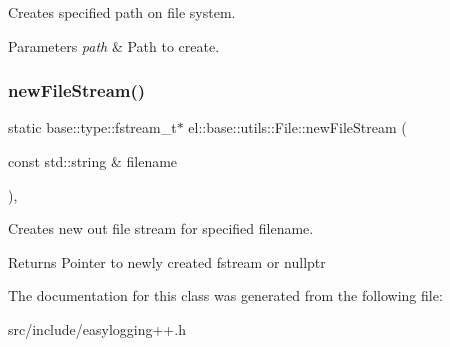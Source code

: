 Creates specified path on file system. 


\begin{DoxyParams}{Parameters}
{\em path} & Path to create. \\
\hline
\end{DoxyParams}
\mbox{\label{classel_1_1base_1_1utils_1_1_file_aa4bef1f2e00269d75c1c1eabb0ce4563}} 
\subsubsection{\texorpdfstring{new\+File\+Stream()}{newFileStream()}}
{\footnotesize\ttfamily static base\+::type\+::fstream\+\_\+t$\ast$ el\+::base\+::utils\+::\+File\+::new\+File\+Stream (\begin{DoxyParamCaption}\item[{const std\+::string \&}]{filename }\end{DoxyParamCaption})\hspace{0.3cm}{\ttfamily [inline]}, {\ttfamily [static]}}



Creates new out file stream for specified filename. 

\begin{DoxyReturn}{Returns}
Pointer to newly created fstream or nullptr 
\end{DoxyReturn}


The documentation for this class was generated from the following file\+:\begin{DoxyCompactItemize}
\item 
src/include/easylogging++.\+h\end{DoxyCompactItemize}
